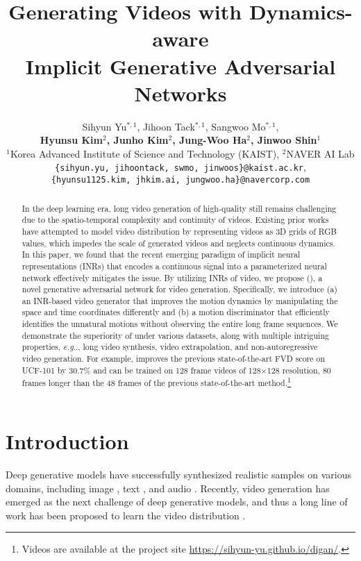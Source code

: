 \documentclass{article} \usepackage{iclr2022_conference,times}
\title{Generating Videos with Dynamics-aware\\Implicit Generative Adversarial Networks}
\author{Sihyun Yu$^{*,1}$, Jihoon Tack$^{*,1}$, Sangwoo Mo$^{*,1}$, \\
{\textbf{Hyunsu Kim$^2$, Junho Kim$^2$, Jung-Woo Ha$^2$, Jinwoo Shin$^1$}}  \\
$^1$Korea Advanced Institute of Science and Technology (KAIST), $^2$NAVER AI Lab\\
\texttt{\{sihyun.yu, jihoontack, swmo, jinwoos\}@kaist.ac.kr}, \\\texttt{\{hyunsu1125.kim, jhkim.ai, jungwoo.ha\}@navercorp.com}}
\makeatletter
\DeclareRobustCommand\onedot{\futurelet\@let@token\@onedot}
\def\@onedot{\ifx\@let@token.\else.\null\fi\xspace}
\def\eg{\emph{e.g}\onedot} \def\Eg{\emph{E.g}\onedot}
\makeatother
\begin{document}
\maketitle

\vspace{-0.1in}
\begin{abstract}
In the deep learning era, long video generation of high-quality still remains challenging due to the spatio-temporal complexity and continuity of videos. Existing prior works have attempted to model video distribution by representing videos as 3D grids of RGB values, which impedes the scale of generated videos and neglects continuous dynamics. In this paper, we found that the recent emerging paradigm of implicit neural representations (INRs) that encodes a continuous signal into a parameterized neural network effectively mitigates the issue. By utilizing INRs of video, we propose \emph{\lname} (\sname), a novel generative adversarial network for video generation. Specifically, we introduce (a) an INR-based video generator that improves the motion dynamics by manipulating the space and time coordinates differently and (b) a motion discriminator that efficiently identifies the unnatural motions without observing the entire long frame sequences. We demonstrate the superiority of \sname under various datasets, along with multiple intriguing properties, \eg, long video synthesis, video extrapolation, and non-autoregressive video generation. For example, \sname improves the previous state-of-the-art FVD score on UCF-101 by 30.7\% and can be trained on 128 frame videos of 128$\times$128 resolution, 80 frames longer than the 48 frames of the previous state-of-the-art method.\footnote{Videos are available at the project site \url{https://sihyun-yu.github.io/digan/}.}
\end{abstract}

\section{Introduction}
\label{sec:intro}

Deep generative models have successfully synthesized realistic samples on various domains, including image \citep{brock2018large,karras2020analyzing,karras2021alias,dhariwal2021diffusion}, text \citep{adiwardana2020towards,brown2020language}, and audio \citep{dhariwal2020jukebox, lakhotia2021generative}. Recently, video generation has emerged as the next challenge of deep generative models, and thus a long line of work has been proposed to learn the video distribution \citep{vondrick2016generating,kalchbrenner2017video,saito2017temporal,saito2020train,tulyakov2018mocogan,acharya2018towards,clark2019adversarial,weissenborn2020scaling,rakhimov2020latent,tian2021good,yan2021videogpt}. 
\end{document}
